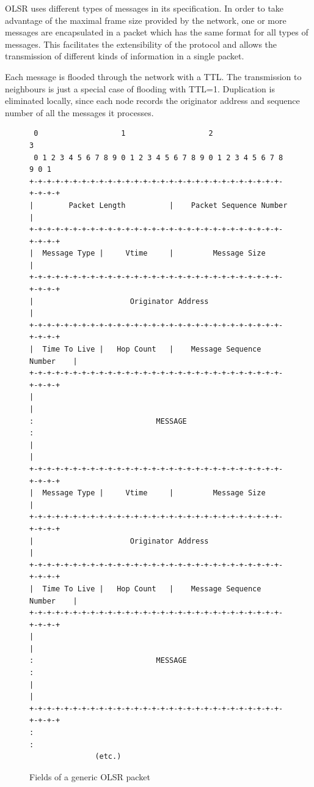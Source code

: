 \documentclass[a4paper,11pt,twoside,openleft]{memoir}
\begin{document}
OLSR uses different types of messages in its specification. In order to
take advantage of the maximal frame size provided by the network, one or
more messages are encapsulated in a packet which has the same format for
all types of messages. This facilitates the extensibility of the
protocol and allows the transmission of different kinds of information
in a single packet.

Each message is flooded through the network with a TTL. The transmission
to neighbours is just a special case of flooding with TTL=1. Duplication is
eliminated locally, since each node records the originator address and
sequence number of all the messages it processes.

\begin{figure}
\begin{verbatim}
 0                   1                   2                   3
 0 1 2 3 4 5 6 7 8 9 0 1 2 3 4 5 6 7 8 9 0 1 2 3 4 5 6 7 8 9 0 1
+-+-+-+-+-+-+-+-+-+-+-+-+-+-+-+-+-+-+-+-+-+-+-+-+-+-+-+-+-+-+-+-+
|        Packet Length          |    Packet Sequence Number     |
+-+-+-+-+-+-+-+-+-+-+-+-+-+-+-+-+-+-+-+-+-+-+-+-+-+-+-+-+-+-+-+-+
|  Message Type |     Vtime     |         Message Size          | 
+-+-+-+-+-+-+-+-+-+-+-+-+-+-+-+-+-+-+-+-+-+-+-+-+-+-+-+-+-+-+-+-+
|                      Originator Address                       |
+-+-+-+-+-+-+-+-+-+-+-+-+-+-+-+-+-+-+-+-+-+-+-+-+-+-+-+-+-+-+-+-+
|  Time To Live |   Hop Count   |    Message Sequence Number    |
+-+-+-+-+-+-+-+-+-+-+-+-+-+-+-+-+-+-+-+-+-+-+-+-+-+-+-+-+-+-+-+-+
|                                                               |
:                            MESSAGE                            :
|                                                               |
+-+-+-+-+-+-+-+-+-+-+-+-+-+-+-+-+-+-+-+-+-+-+-+-+-+-+-+-+-+-+-+-+
|  Message Type |     Vtime     |         Message Size          | 
+-+-+-+-+-+-+-+-+-+-+-+-+-+-+-+-+-+-+-+-+-+-+-+-+-+-+-+-+-+-+-+-+
|                      Originator Address                       |
+-+-+-+-+-+-+-+-+-+-+-+-+-+-+-+-+-+-+-+-+-+-+-+-+-+-+-+-+-+-+-+-+
|  Time To Live |   Hop Count   |    Message Sequence Number    |
+-+-+-+-+-+-+-+-+-+-+-+-+-+-+-+-+-+-+-+-+-+-+-+-+-+-+-+-+-+-+-+-+
|                                                               |
:                            MESSAGE                            :
|                                                               |
+-+-+-+-+-+-+-+-+-+-+-+-+-+-+-+-+-+-+-+-+-+-+-+-+-+-+-+-+-+-+-+-+
:                                                               :
               (etc.)
\end{verbatim}
\caption{Fields of a generic OLSR packet}
\end{figure}
\end{document}
